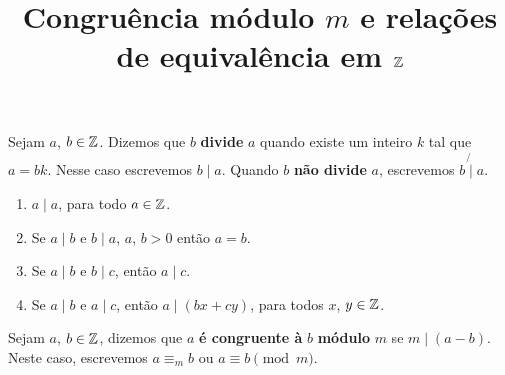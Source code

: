 \documentclass{beamer}
\title{Congruência módulo $m$ e relações de equivalência em $\mathbb{Z}$}
\author[\autor]{\autor}
\institute[\instituto]{\instituto}
\date{}
\begin{document}
    \begin{frame}
        \maketitle
    \end{frame}


    \begin{frame}
        \begin{definicao}
            Sejam $a$, $b \in \mathbb{Z}$. \pause Dizemos que $b$ \textbf{divide} $a$ \pause quando existe um inteiro $k$ tal que $a=bk$. \pause Nesse caso escrevemos $b \mid a$. \pause Quando $b$ \textbf{não divide} $a$, \pause escrevemos $b\not{\mid}a$.
        \end{definicao}
    \end{frame}

    \begin{frame}
        \begin{proposicao}
            \begin{enumerate}[label={\roman*})]
                \item $a\mid a$, para todo $a \in \mathbb{Z}$.\pause \vspace{.3cm}
                \item Se $a\mid b$ e $b\mid a$, $a$, $b > 0$ então $a = b$.\pause \vspace{.3cm}
                \item Se $a\mid b$ e $b\mid c$, então $a\mid c$.\pause \vspace{.3cm}
                \item Se $a\mid b$ e $a\mid c$, então $a\mid (bx+cy)$, para todos $x$, $y \in \mathbb{Z}$.
            \end{enumerate}
        \end{proposicao}
    \end{frame}

    \begin{frame}

        \begin{definicao}
            Sejam $a$, $b \in\mathbb{Z}$, \pause dizemos que $a$ \textbf{é congruente à} $b$ \pause \textbf{módulo} $m$ \pause se $m \mid (a-b)$. \pause Neste caso, escrevemos $a\equiv_{m} b$ \pause ou $a\equiv b \pmod{m}$.
        \end{definicao}
    \end{frame}
\end{document}

